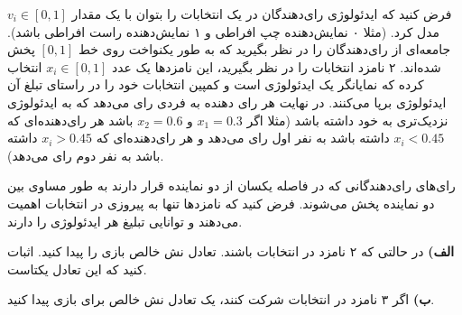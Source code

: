 فرض کنید که ایدئولوژی رای‌دهندگان در یک انتخابات را بتوان با یک مقدار
$v_i \in [0,1]$
مدل کرد. (مثلا ۰ نمایش‌دهنده چپ افراطی و ۱ نمایش‌دهنده راست افراطی باشد). جامعه‌ای از رای‌دهندگان را در نظر بگیرید که به طور یکنواخت روی خط
$[0, 1]$
پخش شده‌اند. ۲ نامزد انتخابات را در نظر بگیرید، این نامزدها یک عدد 
$x_i \in [0, 1]$
انتخاب کرده که نمایانگر یک ایدئولوژی است و کمپین انتخابات خود را در راستای تبلغ آن ایدئولوژی برپا می‌کنند. در نهایت هر رای دهنده به فردی رای می‌دهد که به ایدئولوژی نزدیک‌تری به خود داشته باشد (مثلا اگر
$x_1 = 0.3$
و
$x_2 = 0.6$
باشد هر رای‌دهنده‌ای که
$x_i < 0.45$
داشته باشد به نفر اول رای می‌دهد و هر رای‌دهنده‌ای که
$x_i > 0.45$
داشته باشد به نفر دوم رای می‌دهد).
\vspace{2pt}

رای‌های رای‌دهندگانی که در فاصله یکسان از دو نماینده قرار دارند به طور مساوی بین دو نماینده پخش می‌شوند. فرض کنید که نامزدها تنها به پیروزی در انتخابات اهمیت می‌دهند و توانایی تبلیغ هر ایدئولوژی را دارند.
\vspace{10pt}

\textbf{الف)}
در حالتی که ۲ نامزد در انتخابات باشند. تعادل نش خالص بازی را پیدا کنید. اثبات کنید که این تعادل یکتاست.
\vspace{5pt}

\textbf{ب)}
اگر ۳ نامزد در انتخابات شرکت کنند، یک تعادل نش خالص برای بازی پیدا کنید.